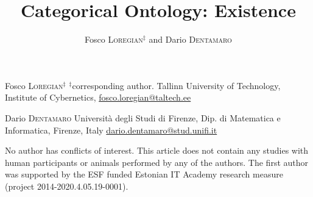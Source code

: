 \documentclass[a4paper,9pt]{../birkjour}
\title{Categorical Ontology: Existence}
\author{Fosco \textsc{Loregian}$^\ddag$ and Dario \textsc{Dentamaro}}
\begin{document}
\scriptsize

\maketitle

\begin{minipage}{.4\textwidth}
  Fosco \textsc{Loregian}$^\ddag$\newline
  $^\ddag$corresponding author. \newline
Tallinn University of Technology,\newline %
Institute of Cybernetics,\newline
\url{fosco.loregian@taltech.ee}
\end{minipage}\hfill %
\begin{minipage}{.4\textwidth}
  Dario \textsc{Dentamaro} \newline
  Università degli Studi di Firenze,\newline
  Dip. di Matematica e Informatica, \newline
  Firenze, Italy\newline
  \url{dario.dentamaro@stud.unifi.it}
\end{minipage}

\vspace*{\fill}%
\normalsize
No author has conflicts of interest. This article does not contain any studies with human participants or animals performed by any of the authors. The first author was supported by the ESF funded Estonian IT Academy research measure (project 2014-2020.4.05.19-0001).
\end{document}

